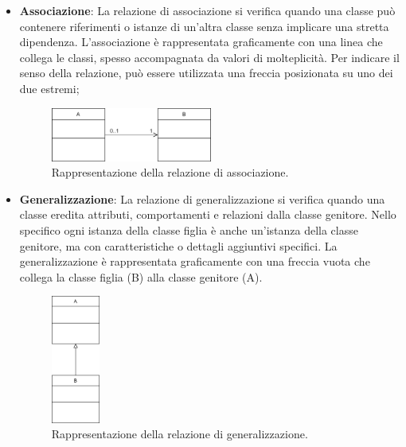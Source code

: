 \documentclass[10pt]{article}
\begin{document}
\begin{justify}
\begin{itemize}
            \item \textbf{Associazione}: La relazione di associazione si verifica quando una classe può contenere riferimenti o istanze di un'altra classe senza implicare una stretta dipendenza. L'associazione è rappresentata graficamente con una linea che collega le classi, spesso accompagnata da valori di molteplicità. Per indicare il senso della relazione, può essere utilizzata una freccia posizionata su uno dei due estremi;
            \begin{figure}[H]
            \centering
            \includegraphics[width=0.5\textwidth]{AssociazioneClasse.png}
            \caption{Rappresentazione della relazione di associazione.}
            \end{figure}

            \item \textbf{Generalizzazione}: La relazione di generalizzazione si verifica quando una classe eredita attributi, comportamenti e relazioni dalla classe genitore. Nello specifico ogni istanza della classe figlia è anche un'istanza della classe genitore, ma con caratteristiche o dettagli aggiuntivi specifici. La generalizzazione è rappresentata graficamente con una freccia vuota che collega la classe figlia (B) alla classe genitore (A).
            \begin{figure}[H]
            \centering
            \includegraphics[width=0.15\textwidth]{GeneralizzazioneClasse.png}
            \caption{Rappresentazione della relazione di generalizzazione.}
            \end{figure}
        \end{itemize}


\end{justify}
\end{document}
